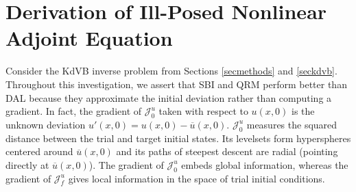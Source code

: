 \documentclass[%
 reprint,
 amsmath,amssymb,
 aps,
 pre,
]{revtex4-2}
\newcommand{\Juo}{\mathcal{J}^{u}_0}
\newcommand{\Juf}{\mathcal{J}^{u}_f}
\begin{document}
\section{Derivation of Ill-Posed Nonlinear Adjoint Equation}
\label{secCongeneralized}
Consider the KdVB inverse problem from Sections \ref{secmethods} and \ref{seckdvb}.
Throughout this investigation, we assert that SBI and QRM perform better than DAL because they approximate the initial deviation rather than computing a gradient.
In fact, the gradient of $\Juo$ taken with respect to $u(x,0)$ is the unknown deviation $u'(x,0)=u(x,0)-\overline{u}(x,0)$.
$\Juo$ measures the squared distance between the trial and target initial states.
Its levelsets form hyperspheres centered around $\overline{u}(x,0)$ and its paths of steepest descent are radial (pointing directly at $\overline{u}(x,0)$).
The gradient of $\Juo$ embeds global information, whereas the gradient of $\Juf$ gives local information in the space of trial initial conditions.
\end{document}
